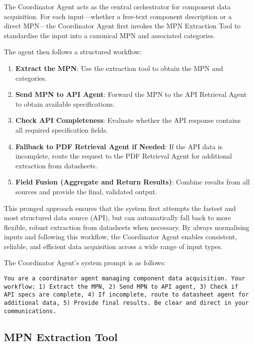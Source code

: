 The Coordinator Agent acts as the central orchestrator for component data acquisition. For each input—whether a free-text component description or a direct MPN—the Coordinator Agent first invokes the MPN Extraction Tool to standardise the input into a canonical MPN and associated categories. 

The agent then follows a structured workflow:
\begin{enumerate}
    \item \textbf{Extract the MPN}: Use the extraction tool to obtain the MPN and categories.
    \item \textbf{Send MPN to API Agent}: Forward the MPN to the API Retrieval Agent to obtain available specifications.
    \item \textbf{Check API Completeness}: Evaluate whether the API response contains all required specification fields.
    \item \textbf{Fallback to PDF Retrieval Agent if Needed}: If the API data is incomplete, route the request to the PDF Retrieval Agent for additional extraction from datasheets.
    \item \textbf{Field Fusion (Aggregate and Return Results)}: Combine results from all sources and provide the final, validated output.
\end{enumerate}

This pronged approach ensures that the system first attempts the fastest and most structured data source (API), but can automatically fall back to more flexible, robust extraction from datasheets when necessary. By always normalising inputs and following this workflow, the Coordinator Agent enables consistent, reliable, and efficient data acquisition across a wide range of input types.

The Coordinator Agent's system prompt is as follows:
\begin{lstlisting}[caption={System prompt for the Coordinator Agent.}, label={lst:coordinator_prompt}, breaklines=true]
You are a coordinator agent managing component data acquisition. Your workflow: 1) Extract the MPN, 2) Send MPN to API agent, 3) Check if API specs are complete, 4) If incomplete, route to datasheet agent for additional data, 5) Provide final results. Be clear and direct in your communications.
\end{lstlisting}

\subsection{MPN Extraction Tool}

